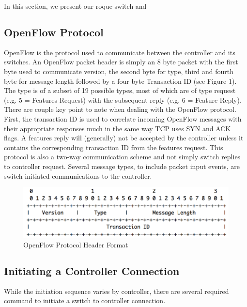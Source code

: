 In this section, we present our roque switch and 

\subsection {OpenFlow Protocol}
OpenFlow is the protocol used to communicate between the controller and its switches. An OpenFlow packet header is simply an 8 byte packet with the first byte used to communicate version, the second byte for type, third and fourth byte for message length followed by a four byte Transaction ID (see Figure 1). The type is of a subset of 19 possible types, most of which are of type request (e.g. 5 = Features Request) with the subsequent reply (e.g. 6 = Feature Reply). There are couple key point to note when dealing with the OpenFlow protocol. First, the transaction ID is used to correlate incoming OpenFlow messages with their appropriate responses much in the same way TCP uses SYN and ACK flags. A features reply will (generally) not be accepted by the controller unless it contains the corresponding transaction ID from the features request. This protocol is also a two-way communication scheme and not simply switch replies to controller request. Several message types, to include packet input events, are switch initiated communications to the controller.  

\begin{figure}
  \includegraphics[width=\linewidth]{openflowProtocol.png}
  \caption{OpenFlow Protocol Header Format \cite{protocol}}
  \label{fig:protocol}
\end{figure}

\subsection {Initiating a Controller Connection}
While the initiation sequence varies by controller, there are several required command to initiate a switch to controller connection.